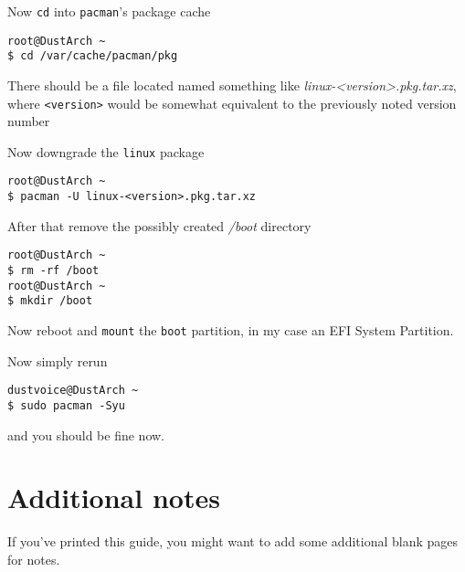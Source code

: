 \documentclass[10pt]{dustdoc}
\begin{document}
Now \texttt{cd} into \texttt{pacman}'s package cache

\begin{verbatim}
root@DustArch ~
$ cd /var/cache/pacman/pkg
\end{verbatim}

There should be a file located named something like \textit{linux-\allowbreak{}<version>.\allowbreak{}pkg.tar.xz}, where \texttt{<version>} would be somewhat equivalent to the previously noted version number

Now downgrade the \texttt{linux} package

\begin{verbatim}
root@DustArch ~
$ pacman -U linux-<version>.pkg.tar.xz
\end{verbatim}

After that remove the possibly created \textit{/boot} directory

\begin{verbatim}
root@DustArch ~
$ rm -rf /boot
root@DustArch ~
$ mkdir /boot
\end{verbatim}

Now reboot and \texttt{mount} the \texttt{boot} partition, in my case an EFI System Partition.

Now simply rerun

\begin{verbatim}
dustvoice@DustArch ~
$ sudo pacman -Syu
\end{verbatim}

\noindent
and you should be fine now.

\chapter{Additional notes}
\label{sec:additional-notes}

If you’ve printed this guide, you might want to add some additional blank pages for notes.
\end{document}
